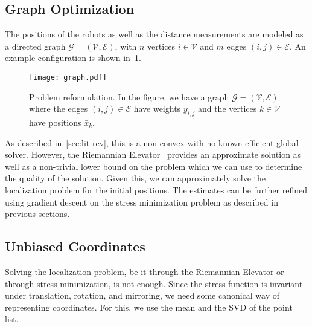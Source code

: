 \subsection{Graph Optimization}
The positions of the robots as well as the distance measurements are modeled as a directed graph $\mathcal{G} = (\mathcal{V}, \mathcal{E})$, with $n$ vertices $i \in \mathcal{V}$ and $m$ edges $(i, j) \in \mathcal{E}$. An example configuration is shown in~\ref{fig:problem-graph}.
\begin{figure}[ht]
    \centering
    \texttt{[image: graph.pdf]}
    \caption{Problem reformulation. In the figure, we have a graph $\mathcal{G}=(\mathcal{V}, \mathcal{E})$ where the edges $(i, j) \in \mathcal{E}$ have weights $y_{i,j}$ and the vertices $k \in \mathcal{V}$ have positions $\bar{x}_k$.}
    \label{fig:problem-graph} 
\end{figure}
As described in~\ref{sec:lit-rev}, this is a non-convex with no known efficient global solver. However, the Riemannian Elevator~\cite{R_elevator} provides an approximate solution as well as a non-trivial lower bound on the problem which we can use to determine the quality of the solution. Given this, we can approximately solve the localization problem for the initial positions. The estimates can be further refined using gradient descent on the stress minimization problem as described in previous sections. 

\subsection{Unbiased Coordinates}
Solving the localization problem, be it through the Riemannian Elevator or through stress minimization, is not enough. Since the stress function is invariant under translation, rotation, and mirroring, we need some canonical way of representing coordinates. For this, we use the mean and the SVD of the point list.

